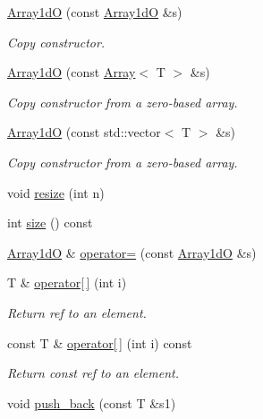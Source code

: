 \begin{DoxyCompactItemize}
\item 
\mbox{\hyperlink{classADAT_1_1Array1dO_abf14ebcf56d52421ff42141883440283}{Array1dO}} (const \mbox{\hyperlink{classADAT_1_1Array1dO}{Array1dO}} \&s)
\begin{DoxyCompactList}\small\item\em Copy constructor. \end{DoxyCompactList}\item 
\mbox{\hyperlink{classADAT_1_1Array1dO_adcc074ae1935a9371a950d1a99bfa3ec}{Array1dO}} (const \mbox{\hyperlink{classXMLArray_1_1Array}{Array}}$<$ T $>$ \&s)
\begin{DoxyCompactList}\small\item\em Copy constructor from a zero-\/based array. \end{DoxyCompactList}\item 
\mbox{\hyperlink{classADAT_1_1Array1dO_aad6c2df87d1dc941fd561fd74d181ddc}{Array1dO}} (const std\+::vector$<$ T $>$ \&s)
\begin{DoxyCompactList}\small\item\em Copy constructor from a zero-\/based array. \end{DoxyCompactList}\item 
void \mbox{\hyperlink{classADAT_1_1Array1dO_afc98b7076e43428faae90d7cb1dab3bf}{resize}} (int n)
\item 
int \mbox{\hyperlink{classADAT_1_1Array1dO_a749307d8e42867d6fac39dc9aca84978}{size}} () const
\item 
\mbox{\hyperlink{classADAT_1_1Array1dO}{Array1dO}} \& \mbox{\hyperlink{classADAT_1_1Array1dO_a387ca64e93f23d140b38bd42e81d05a8}{operator=}} (const \mbox{\hyperlink{classADAT_1_1Array1dO}{Array1dO}} \&s)
\item 
T \& \mbox{\hyperlink{classADAT_1_1Array1dO_a3ec54ce2ab12d922d155e37d1f63a010}{operator\mbox{[}$\,$\mbox{]}}} (int i)
\begin{DoxyCompactList}\small\item\em Return ref to an element. \end{DoxyCompactList}\item 
const T \& \mbox{\hyperlink{classADAT_1_1Array1dO_a48b2dbd0a7e4ee5dce18a12ca19d78be}{operator\mbox{[}$\,$\mbox{]}}} (int i) const
\begin{DoxyCompactList}\small\item\em Return const ref to an element. \end{DoxyCompactList}\item 
void \mbox{\hyperlink{classADAT_1_1Array1dO_a6e326e7686f842918f3cbda5c6a4b05f}{push\+\_\+back}} (const T \&s1)

\end{DoxyCompactItemize}
